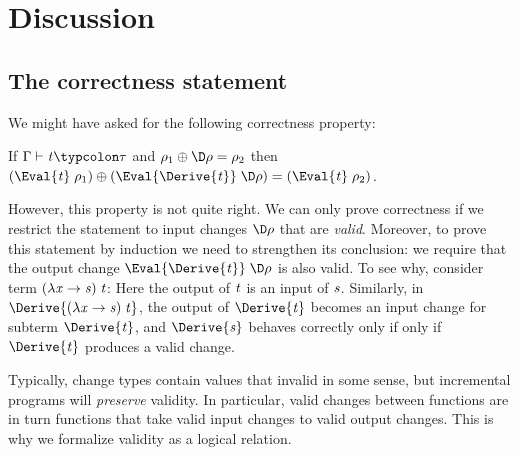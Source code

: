 \section{Discussion}
\subsection{The correctness statement}
We might have asked for the following
correctness property:

\begin{theorem}
If \ensuremath{\Gamma\vdash\Varid{t}\typcolon\tau} and \ensuremath{\rho_{1}\oplus \D\rho\mathrel{=}\rho_{2}} then
\ensuremath{(\Eval{\Varid{t}}\;\rho_{1})\oplus (\Eval{\Derive{\Varid{t}}}\;\D\rho)\mathrel{=}(\Eval{\Varid{t}}\;\rho_{2})}.
\end{theorem}

However, this property is not quite right. We can only prove correctness
if we restrict the statement to input changes \ensuremath{\D\rho} that are
\emph{valid}. Moreover, to prove this
statement by induction we need to strengthen its conclusion: we
require that the output change \ensuremath{\Eval{\Derive{\Varid{t}}}\;\D\rho} is also
valid. To see why, consider term \ensuremath{(\lambda \Varid{x}\to \Varid{s})\;\Varid{t}}: Here the output of \ensuremath{\Varid{t}}
is an input of \ensuremath{\Varid{s}}. Similarly, in \ensuremath{\Derive{(\lambda \Varid{x}\to \Varid{s})\;\Varid{t}}}, the
output of \ensuremath{\Derive{\Varid{t}}} becomes an input change for subterm
\ensuremath{\Derive{\Varid{t}}}, and \ensuremath{\Derive{\Varid{s}}} behaves correctly only if only if
\ensuremath{\Derive{\Varid{t}}} produces a valid change.

Typically, change types
contain values that invalid in some sense, but incremental
programs will \emph{preserve} validity. In particular, valid
changes between functions are in turn functions that take valid input
changes to valid output changes. This is why we
formalize validity as a logical relation.

